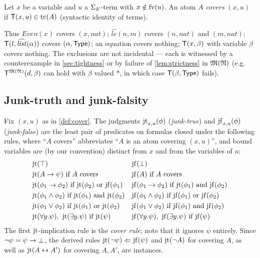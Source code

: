 \begin{definition}[Cover]
  \label{def:cover}
  Let $x$ be a variable and $u$ a $\Sigma_{E}$-term with $x \notin \mathrm{fv}(u)$.  An
  atom $A$ \emph{covers} $(x,u)$ if $\mathsf{T}(x,u) \in \mathrm{tc}(A)$ (syntactic
  identity of terms).
\end{definition}

Thus $\mathit{Even}(x)$ covers $(x, \mathit{nat})$;
$\hat{\mathit{le}}(n,m)$ covers $(n,\mathit{nat})$ and $(m,\mathit{nat})$;
$\mathsf{T}(l, \widehat{\mathit{list}}(\alpha))$ covers $(\alpha, \mathsf{Type})$; an
equation covers nothing; $\mathsf{T}(x,\beta)$ with variable $\beta$ covers
nothing.  The exclusions are not incidental --- each is witnessed by a
counterexample in \cref{sec:tightness} or by failure of
\cref{lem:strictness} in $\mathfrak{M}(\mathfrak{N})$ (e.g.\ $\mathsf{T}^{\mathfrak{M}(\mathfrak{N})}(d,\beta)$ can hold with
$\beta$ valued $\ast$, in which case $\mathsf{T}(\beta,\mathsf{Type})$ fails).

\subsection{Junk-truth and junk-falsity}

\begin{definition}[$\jt$/$\jf$]
  \label{def:jtjf}
  Fix $(x,u)$ as in \cref{def:cover}.  The judgments $\mathrm{jt}_{x,u}(\phi)$
  (\emph{junk-true}) and $\mathrm{jf}_{x,u}(\phi)$ (\emph{junk-false}) are the
  least pair of predicates on formulas closed under the following rules,
  where ``$A$ covers'' abbreviates ``$A$ is an atom covering $(x,u)$'',
  and bound variables are (by our convention) distinct from $x$ and from
  the variables of $u$:
  \begin{align*}
    &\mathrm{jt}(\top)
    && \mathrm{jf}(\bot) \\
    &\mathrm{jt}(A \rightarrow \psi) \ \text{if } A \text{ covers}
    && \mathrm{jf}(A) \ \text{if } A \text{ covers} \\
    &\mathrm{jt}(\phi_1 \rightarrow \phi_2) \ \text{if } \mathrm{jt}(\phi_2) \text{ or } \mathrm{jf}(\phi_1)
    && \mathrm{jf}(\phi_1 \rightarrow \phi_2) \ \text{if } \mathrm{jt}(\phi_1) \text{ and }
       \mathrm{jf}(\phi_2) \\
    &\mathrm{jt}(\phi_1 \wedge \phi_2) \ \text{if } \mathrm{jt}(\phi_1) \text{ and }
      \mathrm{jt}(\phi_2)
    && \mathrm{jf}(\phi_1 \wedge \phi_2) \ \text{if } \mathrm{jf}(\phi_1) \text{ or }
      \mathrm{jf}(\phi_2) \\
    &\mathrm{jt}(\phi_1 \vee \phi_2) \ \text{if } \mathrm{jt}(\phi_1) \text{ or }
      \mathrm{jt}(\phi_2)
    && \mathrm{jf}(\phi_1 \vee \phi_2) \ \text{if } \mathrm{jf}(\phi_1) \text{ and }
      \mathrm{jf}(\phi_2) \\
    &\mathrm{jt}(\forall y.\psi),\ \mathrm{jt}(\exists y.\psi) \ \text{if } \mathrm{jt}(\psi)
    && \mathrm{jf}(\forall y.\psi),\ \mathrm{jf}(\exists y.\psi) \ \text{if } \mathrm{jf}(\psi)
  \end{align*}
  The first $\jt$-implication rule is the \emph{cover rule}; note that it
  ignores $\psi$ entirely.  Since $\neg\psi = \psi \rightarrow \bot$, the derived
  rules $\mathrm{jt}(\neg\psi) \Leftarrow \mathrm{jf}(\psi)$ and
  $\mathrm{jt}(\neg A)$ for covering $A$, as well as
  $\mathrm{jt}(A \leftrightarrow A')$ for covering $A, A'$, are instances.
\end{definition}

